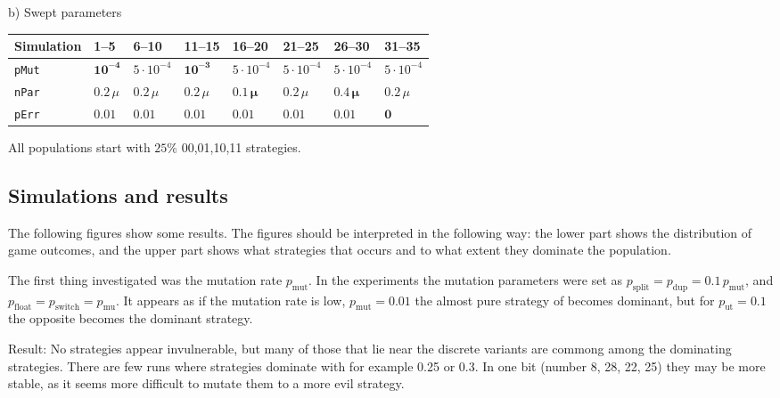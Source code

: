 \begin{table}[!hbtp]
  b) Swept parameters\myhalfpar

  \newcommand \temp {$5\cdot 10^{-4}$}
  \begin{tabular}{*{8}{l}}
    Simulation    & 1--5               & 6--10    & 11--15    & 16--20   & 21--25   & 26--30   & 31--35   \\
    \hline
    \texttt{pMut} & $\mathbf{10^{-4}}$ & \temp       & $\mathbf{10^{-3}}$ & \temp       & \temp       & \temp       & \temp       \\
    \texttt{nPar} & $0.2\,\mu$          & $0.2\,\mu$ & $0.2\,\mu$  & $\mathbf{0.1\,\mu}$ & $0.2\,\mu$ & $\mathbf{0.4\,\mu}$ & $0.2\,\mu$ \\
    \texttt{pErr} & $0.01$             & $0.01$   & $0.01$    & $0.01$   & $0.01$   & $0.01$   & $\mathbf{0}$ 
  \end{tabular}
\end{table}

All populations start with $25 \%$ 00,01,10,11 strategies. \mypar %

\subsection{Simulations and results}
The following figures show some results. The figures should be interpreted in the following way: the lower part shows the distribution of game outcomes, and the upper part shows what strategies that occurs and to what extent they dominate the population.\mypar

The first thing investigated was the mutation rate $p_{\textrm{mut}}$. In the experiments the mutation parameters were set as $p_{\textrm{split}} = p_{\textrm{dup}} = 0.1\,p_{\textrm{mut}}$, and$ p_{\textrm{float}} = p_{\textrm{switch}} = p_{\textrm{mu}}$. It appears as if the mutation rate is low, $p_{\textrm{mut}}=0.01$ the almost pure strategy of  becomes dominant, but for $p_{\textrm{ut}}=0.1$ the opposite  becomes the dominant strategy.\mypar

Result: No strategies appear invulnerable, but many of those that lie near the discrete variants are commong among the dominating strategies. There are few runs where strategies dominate with for example 0.25 or 0.3. In one bit (number 8, 28, 22, 25) they may be more stable, as it seems more difficult to mutate them to a more evil strategy. 


